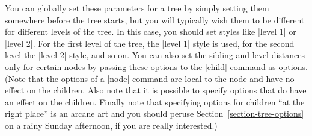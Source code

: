 You can globally set these parameters for a tree by simply setting them
somewhere before the tree starts, but you will typically wish them to be
different for different levels of the tree. In this case, you should set styles
like |level 1| or |level 2|. For the first level of the tree, the |level 1|
style is used, for the second level the |level 2| style, and so on. You can
also set the sibling and level distances only for certain nodes by passing
these options to the |child| command as options. (Note that the options of a
|node| command are local to the node and have no effect on the children. Also
note that it is possible to specify options that do have an effect on the
children. Finally note that specifying options for children ``at the right
place'' is an arcane art and you should peruse
Section~\ref{section-tree-options} on a rainy Sunday afternoon, if you are
really interested.)

